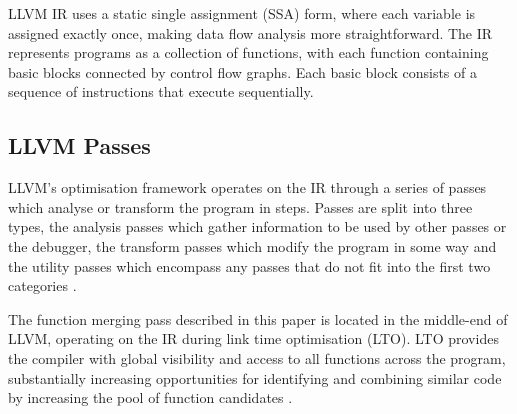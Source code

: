 LLVM IR uses a static single assignment (SSA) form, where each variable is assigned exactly once, making data flow analysis more straightforward. The IR represents programs as a collection of functions, with each function containing basic blocks connected by control flow graphs. Each basic block consists of a sequence of instructions that execute sequentially.

\subsection{LLVM Passes} \label{LLVM:Passes}
LLVM's optimisation framework operates on the IR through a series of passes which analyse or transform the program in steps. Passes are split into three types, the analysis passes which gather information to be used by other passes or the debugger, the transform passes which modify the program in some way and the utility passes which encompass any passes that do not fit into the first two categories \cite{LLVMPasses}. 

The function merging pass described in this paper is located in the middle-end of LLVM, operating on the IR during link time optimisation (LTO). LTO provides the compiler with global visibility and access to all functions across the program, substantially increasing opportunities for identifying and combining similar code by increasing the pool of function candidates \cite{FunctionMergingSequenceAlignment}.



